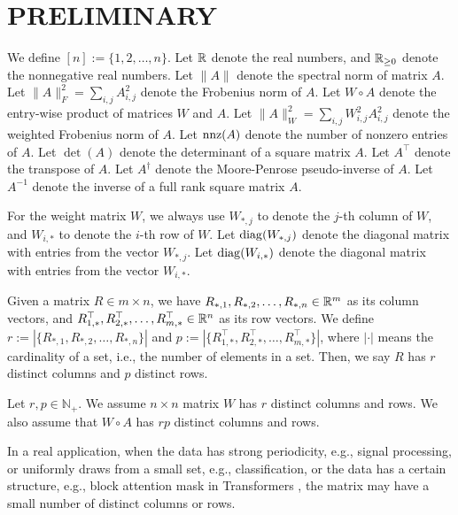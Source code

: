 \section{PRELIMINARY}\label{sec:prelim}

We define $[n]:= \{1,2, \dots, n\}$.
Let $\mathbb{R}$ denote the real numbers, and $\mathbb{R}_{\geq 0}$ denote the nonnegative real numbers. Let $\|A\|$   denote the spectral norm of matrix $A$. Let $\|A\|_{F}^{2}=\sum_{i, j} A_{i, j}^{2}$ denote the Frobenius norm of $A$. Let $W \circ A$ denote the entry-wise product of matrices $W$ and $A$. Let $\|A\|_{W}^{2}=\sum_{i, j} W_{i, j}^{2} A_{i, j}^{2}$ denote the weighted Frobenius norm of $A$. Let $\operatorname{nnz}(A)$ denote the number of nonzero entries of $A$. Let $\det(A)$ denote the determinant of a square matrix $A$. Let $A^{\top}$ denote the transpose of $A$. Let $A^{\dagger}$ denote the Moore-Penrose pseudo-inverse of $A$. Let $A^{-1}$ denote the inverse of a full rank square matrix $A$.

For the weight matrix $W$, we always use $W_{*,j}$ to denote the $j$-th column of $W$, and $W_{i,*}$ to denote the $i$-th row of $W$. Let $\operatorname{diag}(W_{*,j})$ denote the diagonal matrix with entries from the vector $W_{*,j}$. Let $\operatorname{diag}(W_{i,*} )$ denote the diagonal matrix with entries from the  vector $W_{i,*}$.

\begin{definition}\label{def:distinct}
Given a matrix $R \in m \times n$, we have $R_{*,1}, R_{*,2}, \dots, R_{*,n} \in \mathbb{R}^{m}$ as its column vectors, and $R_{1,*}^\top, R_{2,*}^\top, \dots, R_{m,*}^\top \in \mathbb{R}^{n}$ as its row vectors. We define $r:= |\{ R_{*,1}, R_{*,2}, \dots, R_{*,n} \}|$ and $p := |\{ R_{1,*}^\top, R_{2,*}^\top, \dots, R_{m,*}^\top \}|$, where $|\cdot|$ means the cardinality of a set, i.e., the number of elements in a set. Then, we say $R$ has  $r$ distinct columns and $p$ distinct rows.
\end{definition}


\begin{assumption}\label{ass:W}
Let $r, p \in \mathbb{N}_+$.  We assume $n \times n$ matrix $W$ has $r$ distinct columns and rows. We also assume that $W\circ A$ has $rp$ distinct columns and rows.    
\end{assumption}

In a real application, when the data has strong periodicity, e.g., signal processing, or uniformly draws from a small set, e.g., classification, or the data has a certain structure, e.g., block attention mask in Transformers \citep{vsp+17,flexattn}, the matrix may have a small number of distinct columns or rows. 
 


